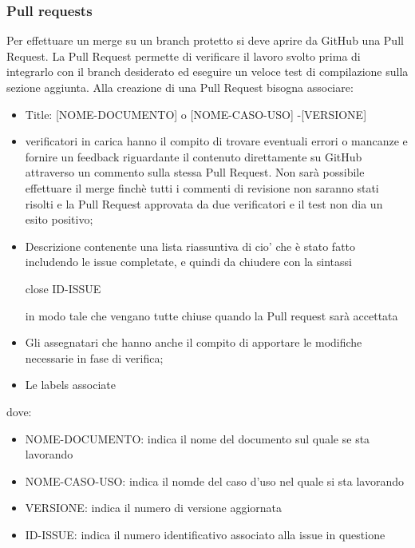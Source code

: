         \subsubsection{Pull requests}
        Per effettuare un merge su un branch protetto si deve aprire da GitHub una Pull Request. La Pull
        Request permette di verificare il lavoro svolto prima di integrarlo con il branch desiderato ed eseguire un veloce test di compilazione sulla sezione aggiunta.
        Alla creazione di una Pull Request bisogna associare:
        \begin{itemize}
            \item Title: [NOME-DOCUMENTO] o [NOME-CASO-USO] -[VERSIONE]
            \item verificatori in carica hanno il compito di trovare eventuali errori o mancanze e fornire un feedback
            riguardante il contenuto direttamente su GitHub attraverso un commento sulla stessa Pull Request.
            Non sarà possibile effettuare il merge finchè tutti i commenti di revisione non saranno stati risolti
            e la Pull Request approvata da due verificatori e il test non dia un esito positivo;
            \item Descrizione contenente una lista riassuntiva di cio' che è stato fatto includendo le issue completate, e quindi da chiudere
            con la sintassi 
            \begin{center}
                close ID-ISSUE
            \end{center}
            in modo tale che vengano tutte chiuse quando la Pull request sarà accettata
            \item Gli assegnatari che hanno anche il compito di apportare le modifiche necessarie in fase di verifica;
            \item Le labels associate
        \end{itemize}
        dove:

        \begin{itemize}
            \item NOME-DOCUMENTO: indica il nome del documento sul quale se sta lavorando
            \item NOME-CASO-USO: indica il nomde del caso d'uso nel quale si sta lavorando
            \item VERSIONE: indica il numero di versione aggiornata
            \item ID-ISSUE: indica il numero identificativo associato alla issue in questione
        \end{itemize}

